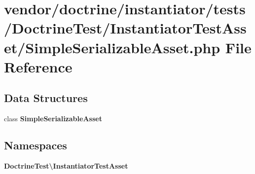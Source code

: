 \section{vendor/doctrine/instantiator/tests/\+Doctrine\+Test/\+Instantiator\+Test\+Asset/\+Simple\+Serializable\+Asset.php File Reference}
\label{_simple_serializable_asset_8php}
\subsection*{Data Structures}
\begin{DoxyCompactItemize}
\item 
class {\bf Simple\+Serializable\+Asset}
\end{DoxyCompactItemize}
\subsection*{Namespaces}
\begin{DoxyCompactItemize}
\item 
 {\bf Doctrine\+Test\textbackslash{}\+Instantiator\+Test\+Asset}
\end{DoxyCompactItemize}
